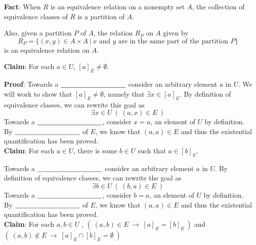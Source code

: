 \documentclass[12pt, oneside]{article}
\begin{document}
{\bf Fact}: When $R$ is an equivalence relation on a nonempty set $A$, 
the collection of equivalence classes of $R$ is a partition of $A$.

Also, given a partition $P$ of $A$, the relation $R_P$ on $A$ given by 
\[
    R_P = \{ (x,y) \in A \times A ~|~ \text{$x$ and $y$ are in the same part of the partition $P$}\}
\]
is an equivalence relation on $A$. 



{\bf Claim}: For each  $a \in U$, $[a]_{E}  \neq  \emptyset$.

{\bf Proof}: Towards a $\underline{\phantom{\hspace{1.3in}}}$ 
consider an arbitrary element $a$ in $U$. 
We will work to show that $[a]_E \neq \emptyset$, namely that $\exists x \in [a]_E$.
By definition of equivalence classes, we can rewrite this goal as 
$$\exists x \in U ~( ~(a,x) \in E~)$$ 
Towards a $\underline{\phantom{\hspace{1.3in}}}$, consider $x = a$, 
an element of $U$ by definition. By $\underline{\phantom{\hspace{1.3in}}}$ of $E$, 
we know that $(a,a) \in E$  and thus the existential quantification has been proved.\\


{\bf Claim}: For each $a \in U$, there is some $b \in U$  such that $a \in [b]_{E}$.

Towards a $\underline{\phantom{\hspace{1.3in}}}$ 
consider an arbitrary element $a$ in $U$. By definition of equivalence classes, 
we can rewrite the goal as 
$$\exists b \in U ~( ~(b,a) \in E~)$$
Towards a $\underline{\phantom{\hspace{1.3in}}}$, consider $b = a$, 
an element of $U$ by definition. By $\underline{\phantom{\hspace{1.3in}}}$  of $E$, 
we know that $(a,a) \in E$  and thus the existential quantification has been proved. \\
 
{\bf Claim}: For each  $a,b  \in U$ , $(~(a,b)  \in  E ~\to ~ [a]_{E}  = [b]_{E}~)$
and  $(~(a,b)  \notin  E ~\to ~ [a]_{E} \cap[b]_{E} = \emptyset~)$

\phantom{Let $a,b$ be arbitrary. For first goal, assume towards
direct proof that $(a,b) \in E$. To show $[a]_E = [b]_E$ 
first consider arbitrary element $x$ in $[a]_E$. By definition
$(a,x) \in E$ so by symmetry, $(x,a) \in E$ and by 
transitivity with assumption, $(x,b)\in E$. Thus, by definition
of equivalence class, $x \in [b]_E$. Similarly, take arbitrary
element $y \in [b]_E$. By definition $(y,b) \in E$ 
and applying symmetry to assumption, we have $(b,a) \in E$
so by transitivity $(y,a) \in E$ and $y \in[a]_E$, as required
to complete the proof of set equality. For the second goal, 
assume (towards a proof by contrapositive) that $[a]_E \cap [b]_E 
\neq \emptyset$. Then there is a witness $w \in [a]_E \cap [b]_E$.
By definition of equivalence classes $(a,w) \in E$ and $(b,w) \in E$.
By symmetry, we have $(w,b) \in E$ so by transitivity $(a,b) \in E$,
as required.}
\end{document}
